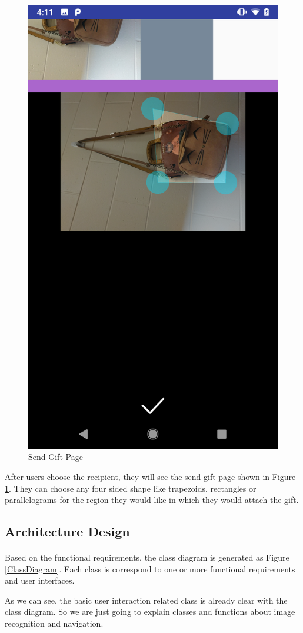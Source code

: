 \begin{figure}[htb]
\centering
\includegraphics[width=.5\textwidth]{section03/assets/SendGift.png}
\caption[Short Caption 2]{\label{SendGiftUI}Send Gift Page}
\end{figure}
\par After users choose the recipient, they will see the send gift page shown in Figure \ref{SendGiftUI}. They can choose any four sided shape like trapezoids, rectangles or parallelograms for the region they would like in which they would attach the gift.

\subsection{Architecture Design}
\paragraph{}Based on the functional requirements, the class diagram is generated as Figure \ref{ClassDiagram}. Each class is correspond to one or more functional requirements and user interfaces.
\par As we can see, the basic user interaction related class is already clear with the class diagram. So we are just going to explain classes and functions about image recognition and navigation.


